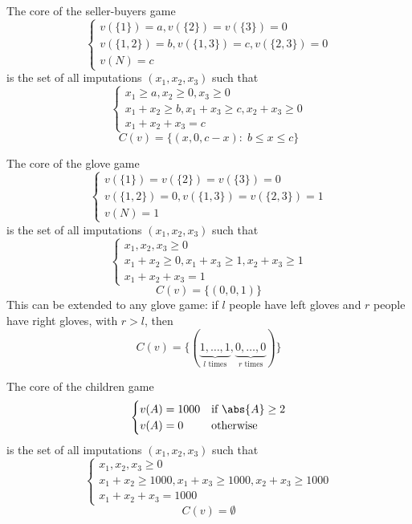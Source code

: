\documentclass[../main.tex]{subfiles}
\begin{document}
\begin{example}
    \label{ex:seller-buyers-core}
    The core of the seller-buyers game
    \[
        \begin{cases}
            v(\{1\}) = a, v(\{2\}) = v(\{3\}) = 0          \\
            v(\{1,2\}) = b, v(\{1,3\}) = c, v(\{2,3\}) = 0 \\
            v(N) = c
        \end{cases}
    \]
    is the set of all imputations $(x_1, x_2, x_3)$ such that
    \[
        \begin{cases}
            x_1 \geq a, x_2 \geq 0, x_3 \geq 0                   \\
            x_1 + x_2 \geq b, x_1 + x_3 \geq c, x_2 + x_3 \geq 0 \\
            x_1 + x_2 + x_3 = c
        \end{cases}
    \]
    \[
        C(v) = \{(x, 0, c-x) : \; b \leq x \leq c\}
    \]
\end{example}
\begin{example}
    The core of the glove game
    \[
        \begin{cases}
            v(\{1\}) = v(\{2\}) = v(\{3\}) = 0          \\
            v(\{1,2\}) = 0, v(\{1,3\}) = v(\{2,3\}) = 1 \\
            v(N) = 1
        \end{cases}
    \]
    is the set of all imputations $(x_1, x_2, x_3)$ such that
    \[
        \begin{cases}
            x_1, x_2, x_3 \geq 0                                 \\
            x_1 + x_2 \geq 0, x_1 + x_3 \geq 1, x_2 + x_3 \geq 1 \\
            x_1 + x_2 + x_3 = 1
        \end{cases}
    \]
    \[
        C(v) = \{(0, 0, 1)\}
    \]
    This can be extended to any glove game: if $l$ people have left gloves and $r$ people have right gloves, with $r >l$, then
    \[
        C(v) = \{(\underbrace{1, \ldots, 1}_{l \text{ times}}, \underbrace{0, \ldots, 0}_{r \text{ times}})\}
    \]
\end{example}
\newpage
\begin{example}
    \label{ex:children-game-core}
    The core of the children game
    \[
        \begin{cases}
            v(A) = 1000 & \text{if } \abs{A} \geq 2 \\
            v(A) = 0    & \text{otherwise}
        \end{cases}
    \]
    is the set of all imputations $(x_1, x_2, x_3)$ such that
    \[
        \begin{cases}
            x_1, x_2, x_3 \geq 0                                          \\
            x_1 + x_2 \geq 1000, x_1 + x_3 \geq 1000, x_2 + x_3 \geq 1000 \\
            x_1 + x_2 + x_3 = 1000
        \end{cases}
    \]
    \[
        C(v) = \emptyset
    \]
\end{example}
\end{document}
